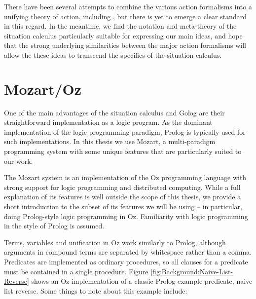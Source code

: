 There have been several attempts to combine the various action formalisms
into a unifying theory of action, including \citep{belleghem95combine_sitcalc_evtcalc,kowalski97reconcile_sitcalc_evtcalc,thielscher06reconcile_sc_fc,thielscher07unifying_action_calculus},
but there is yet to emerge a clear standard in this regard. In the
meantime, we find the notation and meta-theory of the situation calculus
particularly suitable for expressing our main ideas, and hope that
the strong underlying similarities between the major action formalisms
will allow the these ideas to transcend the specifics of the situation
calculus.


\section{Mozart/Oz\label{sec:Background:Mozart/Oz}}

One of the main advantages of the situation calculus and Golog are
their straightforward implementation as a logic program. As the dominant
implementation of the logic programming paradigm, Prolog is typically
used for such implementations. In this thesis we use Mozart, a multi-paradigm
programming system with some unique features that are particularly
suited to our work.

The Mozart system \citep{vanroy99mozart} is an implementation of
the Oz programming language \citep{vanRoyHaridi04ctm} with strong
support for logic programming and distributed computing. While a full
explanation of its features is well outside the scope of this thesis,
we provide a short introduction to the subset of its features we will
be using -- in particular, doing Prolog-style logic programming in
Oz. Familiarity with logic programming in the style of Prolog is assumed.

Terms, variables and unification in Oz work similarly to Prolog,
although arguments in compound terms are separated by whitespace rather
than a comma. Predicates are implemented as ordinary procedures, so
all clauses for a predicate must be contained in a single procedure.
Figure \ref{fig:Background:Naive-List-Reverse} shows an Oz implementation
of a classic Prolog example predicate, naive list reverse. Some things
to note about this example include:

